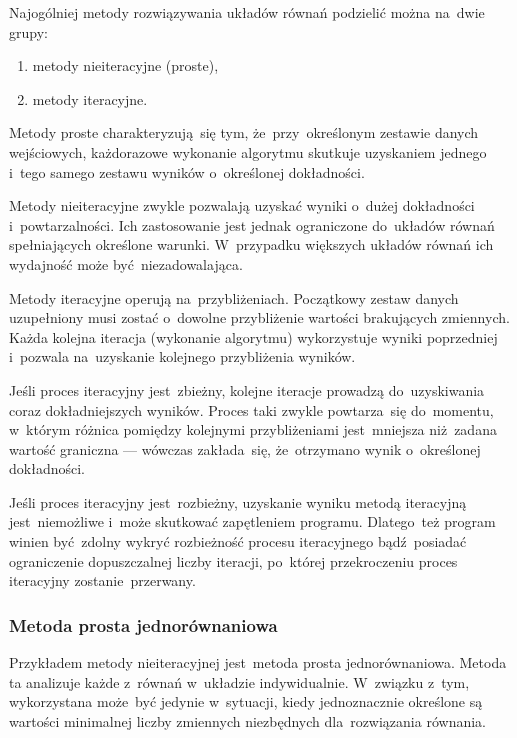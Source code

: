 Najogólniej metody rozwiązywania układów równań podzielić można na~dwie
grupy:

\begin{enumerate}

	\item metody nieiteracyjne (proste),

	\item metody iteracyjne.

\end{enumerate}

Metody proste charakteryzują~się tym, że~przy~określonym zestawie danych
wejściowych, każdorazowe wykonanie algorytmu skutkuje uzyskaniem jednego
i~tego samego zestawu wyników o~określonej dokładności.

Metody nieiteracyjne zwykle pozwalają uzyskać wyniki o~dużej dokładności
i~powtarzalności. Ich zastosowanie jest jednak ograniczone do~układów
równań spełniających określone warunki. W~przypadku większych układów
równań ich wydajność może być~niezadowalająca.

Metody iteracyjne operują na~przybliżeniach. Początkowy zestaw danych
uzupełniony musi zostać o~dowolne przybliżenie wartości brakujących
zmiennych. Każda kolejna iteracja (wykonanie algorytmu) wykorzystuje
wyniki poprzedniej i~pozwala na~uzyskanie kolejnego przybliżenia
wyników.

Jeśli proces iteracyjny jest~zbieżny, kolejne iteracje prowadzą
do~uzyskiwania coraz dokładniejszych wyników. Proces taki zwykle
powtarza~się do~momentu, w~którym różnica pomiędzy kolejnymi
przybliżeniami jest~mniejsza niż~zadana wartość graniczna --- wówczas
zakłada~się, że~otrzymano wynik o~określonej dokładności.

Jeśli proces iteracyjny jest~rozbieżny, uzyskanie wyniku metodą
iteracyjną jest~niemożliwe i~może skutkować zapętleniem programu.
Dlatego~też program winien być~zdolny wykryć rozbieżność procesu
iteracyjnego bądź~posiadać ograniczenie dopuszczalnej liczby iteracji,
po~której przekroczeniu proces iteracyjny zostanie~przerwany.


\subsubsection{Metoda prosta jednorównaniowa}

Przykładem metody nieiteracyjnej jest~metoda prosta jednorównaniowa.
Metoda ta analizuje każde z~równań w~układzie indywidualnie. W~związku
z~tym, wykorzystana może~być jedynie w~sytuacji, kiedy jednoznacznie
określone są wartości minimalnej liczby zmiennych niezbędnych
dla~rozwiązania równania.

